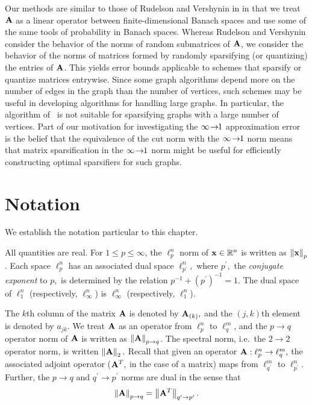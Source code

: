 Our methods are similar to those of Rudelson and Vershynin in \cite{RV07} in
that we treat $\mathbf{A}$ as a linear operator between finite-dimensional
Banach spaces and use some of the same tools of probability in Banach spaces.
Whereas Rudelson and Vershynin consider the behavior of the norms of random
submatrices of $\mathbf{A}$, we consider the behavior of the norms of matrices
formed by randomly sparsifying (or quantizing) the entries of $\mathbf{A}$. This
yields error bounds applicable to schemes that sparsify or quantize matrices
entrywise. Since some graph algorithms depend more on the number of edges in the
graph than the number of vertices, such schemes may be useful in developing
algorithms for handling large graphs.
% 
% 
In particular, the algorithm of~\cite{BSS08} is not suitable for sparsifying graphs
with a large number of vertices. Part of our motivation for investigating the
$\infty\!\rightarrow\!\!1$ approximation error is the belief that the equivalence of the cut norm
with the $\infty\!\rightarrow\!\!1$ norm means that matrix sparsification in the $\infty\!\rightarrow\!\!1$ norm
might be useful for efficiently constructing optimal sparsifiers for such
graphs.


\section{Notation}
We establish the notation particular to this chapter.

All quantities are real. For $1\leq p\leq\infty$, the $\ell_p^n$ norm of $\mathbf{x} \in \mathbb{R}^n$ is written as
$\left\|\mathbf{x}\right\|_p$. Each space $\ell_p^n$ has an associated dual space $\ell_{p^\prime}^n,$ where
$p^\prime,$ the \emph{conjugate exponent} to $p,$ is determined by the relation $p^{-1} + (p^\prime)^{-1} = 1.$ 
The dual space of $\ell_1^n$ (respectively, $\ell_\infty^n$) is 
$\ell_\infty^n$ (respectively, $\ell_1^n$).

The $k$th column of the matrix $\mathbf{A}$ is denoted by $\mathbf{A}_{(k)},$ and the $(j,k)$th element is 
denoted by $a_{jk}.$ We treat $\mathbf{A}$ as an operator from $\ell_{p}^{n}$ to
$\ell_{q}^{m}$, and the $p\rightarrow q$ operator norm of $\mathbf{A}$ is written
as $\left\|\mathbf{A}\right\|_{p\rightarrow q}$. The spectral norm, i.e.\ the $2 \rightarrow 2$ operator norm, is written
$\left\|\mathbf{A}\right\|_2.$ Recall that given an operator $\mathbf{A} : \ell_{p}^{n} \rightarrow \ell_q^{m},$
the associated adjoint operator ($\mathbf{A}^T,$ in the case of a matrix) maps
from $\ell_{q^\prime}^{m}$ to $\ell_{p^\prime}^{n}.$ Further, the $p\rightarrow q$ and $q^{\prime}
\rightarrow p^{\prime}$ norms are dual in the sense that 
\[
\left\|\mathbf{A}\right\|_{p\rightarrow q}=\left\|\mathbf{A}^{T}\right\|_{q^{\prime}\rightarrow
p^{\prime}}.
\]

